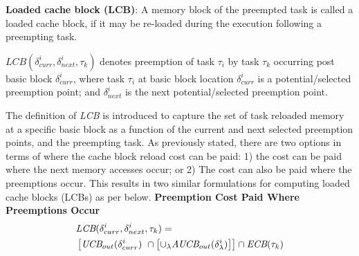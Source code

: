 \begin{definition}
\textbf{Loaded cache block (LCB)}: A memory block of the preempted task is called a loaded cache block, if it may be re-loaded during the execution following a preempting task.
\end{definition}
\noindent
\begin{math}\textit{LCB}(\delta_{curr}^{i},\delta_{next}^{i},\tau_{k})\end{math} denotes preemption of task \begin{math}\tau_{i}\end{math} by task \begin{math}\tau_{k}\end{math} occurring post basic block \begin{math}\delta_{curr}^{i}\end{math}, where task \begin{math}\tau_{i}\end{math} at basic block location \begin{math}\delta_{curr}^{i}\end{math} is a potential/selected preemption point; and \begin{math}\delta_{next}^{i}\end{math} is the next potential/selected preemption point.

The definition of \textit{LCB} is introduced to capture the set of task reloaded memory at a specific basic block as a function of the current and next selected preemption points, and the preempting task.  As previously stated, there are two options in terms of where the cache block reload cost can be paid: 1) the cost can be paid where the next memory accesses occur; or 2) The cost can also be paid where the preemptions occur.  This results in two similar formulations for computing loaded cache blocks (LCBs) as per below.
\newline
\newline
\noindent\textbf{Preemption Cost Paid Where Preemptions Occur}
\begin{equation}\label{eqn:lcb-formula-1}
\begin{split}
    \lefteqn{\textit{LCB}(\delta_{curr}^{i},\delta_{next}^{i},\tau_{k}) =} & \\
    &\left[\textit{UCB}_{out}(\delta_{curr}^{i})\ \cap \left[\cup_\lambda \textit{AUCB}_{out}(\delta_{\lambda}^{i})\right]\right] \cap \textit{ECB}(\tau_{k})\\
\end{split}
\end{equation}

